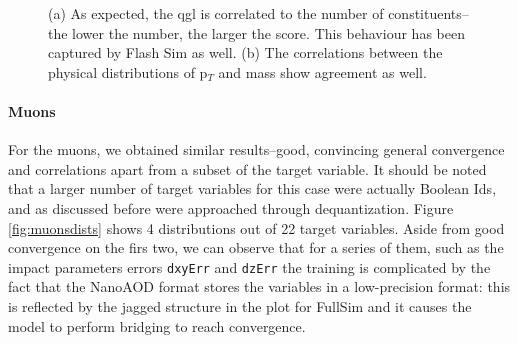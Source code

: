 \begin{figure}
    \myfloatalign
    \caption[qgl and p$_T$ correlations]{ (a) As expected, the qgl is correlated to the number of constituents--the lower the number, the larger the score. This behaviour has been captured by Flash Sim as well. (b) The correlations between the physical distributions of p$_T$ and mass show agreement as well.}\label{fig:corrjet2+3}
    
\end{figure}

\paragraph{Muons}

For the muons, we obtained similar results--good, convincing general convergence and correlations apart from a subset of the target variable. It should be noted that a larger number of target variables for this case were actually Boolean Ids, and as discussed before were approached through dequantization. Figure \ref{fig:muonsdists} shows 4 distributions out of 22 target variables. Aside from good convergence on the firs two, we can observe that for a series of them, such as the impact parameters errors \texttt{dxyErr} and \texttt{dzErr} the training is complicated by the fact that the NanoAOD format stores the variables in a low-precision format: this is reflected by the jagged structure in the plot for FullSim and it causes the model to perform bridging to reach convergence.

